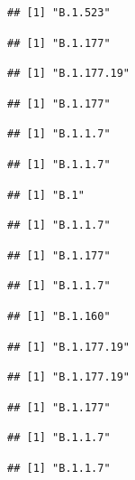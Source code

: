 \documentclass[
]{article}
\begin{document}
\begin{verbatim}
## [1] "B.1.523"
\end{verbatim}

\begin{verbatim}
## [1] "B.1.177"
\end{verbatim}

\begin{verbatim}
## [1] "B.1.177.19"
\end{verbatim}

\begin{verbatim}
## [1] "B.1.177"
\end{verbatim}

\begin{verbatim}
## [1] "B.1.1.7"
\end{verbatim}

\begin{verbatim}
## [1] "B.1.1.7"
\end{verbatim}

\begin{verbatim}
## [1] "B.1"
\end{verbatim}

\begin{verbatim}
## [1] "B.1.1.7"
\end{verbatim}

\begin{verbatim}
## [1] "B.1.177"
\end{verbatim}

\begin{verbatim}
## [1] "B.1.1.7"
\end{verbatim}

\begin{verbatim}
## [1] "B.1.160"
\end{verbatim}

\begin{verbatim}
## [1] "B.1.177.19"
\end{verbatim}

\begin{verbatim}
## [1] "B.1.177.19"
\end{verbatim}

\begin{verbatim}
## [1] "B.1.177"
\end{verbatim}

\begin{verbatim}
## [1] "B.1.1.7"
\end{verbatim}

\begin{verbatim}
## [1] "B.1.1.7"
\end{verbatim}
\end{document}
